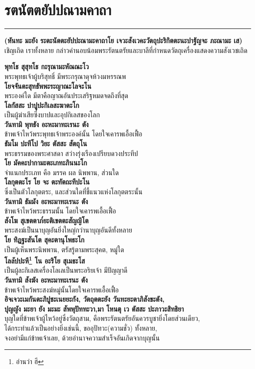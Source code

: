 \documentclass[12pt]{article}
\begin{document}
\section{รตนัตตยัปปณามคาถา}
\hrule
\begin{center}
\textbf{(หันทะ มะยัง ระตะนัตตะยัปปะณามะคาถาโย เจวะสังเวคะวัตถุปะริกิตตะนะปาฐัญจะ ภะณามะ เส)\\}
เชิญเถิด เราทั้งหลาย กล่าวคำนอบน้อมพระรัตนตรัยและบาลีที่กำหนดวัตถุเครื่องแสดงความสังเวชเถิด
\end{center}
\textbf{พุทโธ สุสุทโธ กะรุณามะหัณณะโว\\}
\indent พระพุทธเจ้าผู้บริสุทธิ์ มีพระกรุณาดุจห้วงมหรรณพ\\
\textbf{โยจจันตะสุทธัพพะระญาณะโลจะโน\\}
\indent พระองค์ใด มีตาคือญาณอันประเสริฐหมดจดถึงที่สุด\\
\textbf{โลกัสสะ ปาปูปะกิเลสะฆาตะโก\\}
\indent เป็นผู้ฆ่าเสียซึ่งบาปและอุปกิเลสของโลก\\
\textbf{วันทามิ พุทธัง อะหะมาทะเรนะ ตัง\\}
\indent ข้าพเจ้าไหว้พระพุทธเจ้าพระองค์นั้น โดยใจเคารพเอื้อเฟื้อ\\
\textbf{ธัมโม ปะทีโป วิยะ ตัสสะ สัตถุโน\\}
\indent พระธรรมของพระศาสดา สว่างรุ่งเรืองเปรียบดวงประทีป\\
\textbf{โย มัคคะปากามะตะเภทะภินนะโก\\}
\indent จำแนกประเภท คือ มรรค ผล นิพพาน, ส่วนใด\\
\textbf{โลกุตตะโร โย จะ ตะทัตถะทีปะโน\\}
\indent ซึ่งเป็นตัวโลกุตตระ, และส่วนใดที่ชี้แนวแห่งโลกุตตระนั้น\\
\textbf{วันทามิ ธัมมัง อะหะมาทะเรนะ ตัง\\}
\indent ข้าพเจ้าไหว้พระธรรมนั้น โดยใจเคารพเอื้อเฟื้อ\\
\textbf{สังโฆ สุเขตตาภ๎ยะติเขตตะสัญญิโต\\}
\indent พระสงฆ์เป็นนาบุญอันยิ่งใหญ่กว่านาบุญอันดีทั้งหลาย\\
\textbf{โย ทิฏฐะสันโต สุคะตานุโพธะโก\\}
\indent เป็นผู้เห็นพระนิพพาน, ตรัสรู้ตามพระสุคต, หมู่ใด\\
\textbf{โลลัปปะหี\footnote{อ่านว่า ฮี} โน อะริโย สุเมธะโส\\}
\indent เป็นผู้ละกิเลสเครื่องโลเลเป็นพระอริยเจ้า มีปัญญาดี\\
\textbf{วันทามิ สังฆัง อะหะมาทะเรนะ ตัง\\}
\indent ข้าพเจ้าไหว้พระสงฆ์หมู่นั้นโดยใจเคารพเอื้อเฟื้อ\\
\textbf{อิจเจวะเมกันตะภิปูชะเนยยะกัง, วัตถุตตะยัง วันทะยะตาภิสังขะตัง,\\
ปุญญัง มะยา ยัง มะมะ สัพพุปัททะวา,มา โหนตุ เว ตัสสะ ปะภาวะสิทธิยา\\}
\indent บุญใดที่ข้าพเจ้าผู้ไหว้อยู่ซึ่งวัตถุสาม, คือพระรัตนตรัยอันควรบูชายิ่งโดยส่วนเดียว,\\
\indent ได้กระทำแล้วเป็นอย่างยิ่งเช่นนี้, ขออุปัทวะ(ความชั่ว) ทั้งหลาย,\\
\indent จงอย่ามีแก่ข้าพเจ้าเลย, ด้วยอำนาจความสำเร็จอันเกิดจากบุญนั้น\\
\pagebreak
\end{document}
